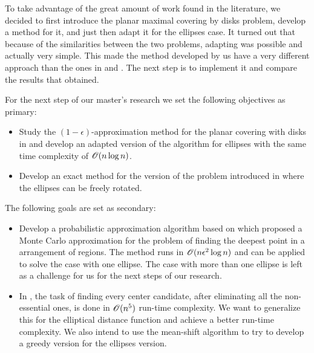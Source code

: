 To take advantage of the great amount of work found in the literature,
 we decided to first introduce the planar maximal covering by disks problem, develop a method for it, and just then adapt it for the ellipses case. It turned out that because of the similarities between the two problems, adapting was possible and actually very simple. This made the method developed by us have a very different approach than the ones in \cite{andreta} and \cite{canbolat}. The next step is to implement it and compare the results that \cite{andreta} obtained.
 
For the next step of our master's research we set the following objectives as primary:

\begin{itemize}
    \item Study the $(1-\epsilon)$-approximation method for the planar covering with disks in \cite{cabello:2006} and develop an adapted version of the algorithm for ellipses with the same time complexity of $\mathscr{O}(n\log{n})$.
    
    \item Develop an exact method for the version of the problem introduced in \cite{andreta} where the ellipses can be freely rotated.
    
\end{itemize}

The following goals are set as secondary:

\begin{itemize}
    \item Develop a probabilistic approximation algorithm based on \cite{aronov:2008} which proposed a Monte Carlo approximation for the problem of finding the deepest point in a arrangement of regions. The method runs in $\mathscr{O}(n\epsilon^2\log{n})$ and can be applied to solve the case with one ellipse. The case with more than one ellipse is left as a challenge for us for the next steps of our research.
    
    \item In \cite{zhou}, the task of finding every center candidate, after eliminating all the non-essential ones, is done in $\mathscr{O}(n^5)$ run-time complexity. We want to generalize this for the elliptical distance function and achieve a better run-time complexity. We also intend to use the mean-shift algorithm to try to develop a greedy version for the ellipses version.
\end{itemize}



